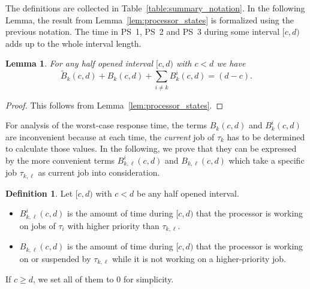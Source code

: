 \documentclass[conference]{IEEEtran}
\newtheorem{lem}[thm]{Lemma}
\theoremstyle{definition}
\newtheorem{defn}[thm]{Definition}
\theoremstyle{remark}
\newcommand{\Btilde}{\widetilde{B}}
\begin{document}
	The definitions are collected in Table~\ref{table:summary_notation}.
	In the following Lemma, the result from Lemma~\ref{lem:processor_states} is formalized using the previous notation.
	The time in PS~1, PS~2 and PS~3 during some interval $[c,d)$ adds up to the whole interval length.

	\begin{lem}\label{lem:distribution_ps_with_b}
		For any half opened interval $[c,d)$ with $c<d$ we have
		\begin{equation}
			\Btilde_k(c,d) + B_k(c,d) + \sum_{i \neq k} B^i_k(c,d) =(d-c).
		\end{equation}
	\end{lem}
	
	\begin{proof}
		This follows from Lemma~\ref{lem:processor_states}.
	\end{proof}
	
	
	For analysis of the worst-case response time, the terms $B_k(c,d)$ and $B^i_k(c,d)$ are inconvenient because at each time, the \emph{current} job of $\tau_k$ has to be determined to calculate those values.
	In the following, we prove that they can be expressed by the more convenient terms $B_{k,\ell}^i(c,d)$ and $B_{k,\ell}(c,d)$ which take a specific job $\tau_{k,\ell}$ as current job into consideration.
	
	\begin{defn}\label{def:B_interferences_refinement}
		Let $[c,d)$ with $c<d$ be any half opened interval.
		\begin{itemize}
			\item $B_{k,\ell}^i(c,d)$ is the amount of time during $[c,d)$ that the processor is working on jobs of $\tau_i$ with higher priority than $\tau_{k,\ell}$.
			\item $B_{k,\ell}(c,d)$ is the amount of time during $[c,d)$ that the processor is working on or suspended by $\tau_{k,\ell}$ while it is not working on a higher-priority job.
		\end{itemize}
		If $c\geq d$, we set all of them to $0$ for simplicity.
	\end{defn}
\end{document}

